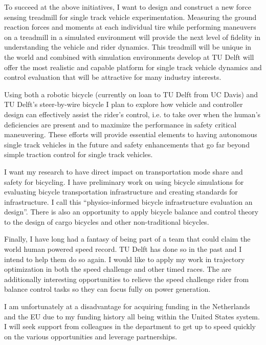 \documentclass{article}
\begin{document}
To succeed at the above initiatives, I want to design and construct a new force
sensing treadmill for single track vehicle experimentation. Measuring the
ground reaction forces and moments at each individual tire while performing
maneuvers on a treadmill in a simulated environment will provide the next level
of fidelity in understanding the vehicle and rider dynamics. This treadmill
will be unique in the world and combined with simulation environments develop
at TU Delft will offer the most realistic and capable platform for single track
vehicle dynamics and control evaluation that will be attractive for many
industry interests.

Using both a robotic bicycle (currently on loan to TU Delft from UC Davis) and
TU Delft's steer-by-wire bicycle I plan to explore how vehicle and controller
design can effectively assist the rider's control, i.e. to take over when the
human's deficiencies are present and to maximize the performance in safety
critical maneuvering. These efforts will provide essential elements to having
autonomous single track vehicles in the future and safety enhancements that go
far beyond simple traction control for single track vehicles.

I want my research to have direct impact on transportation mode share and
safety for bicycling. I have preliminary work on using bicycle simulations for
evaluating bicycle transportation infrastructure and creating standards for
infrastructure. I call this ``physics-informed bicycle infrastructure
evaluation an design''. There is also an opportunity to apply bicycle balance
and control theory to the design of cargo bicycles and other non-traditional
bicycles.

Finally, I have long had a fantasy of being part of a team that could claim the
world human powered speed record. TU Delft has done so in the past and I intend
to help them do so again. I would like to apply my work in trajectory
optimization in both the speed challenge and other timed races. The are
additionally interesting opportunities to relieve the speed challenge rider
from balance control tasks so they can focus fully on power generation.

I am unfortunately at a disadvantage for acquiring funding in the Netherlands
and the EU due to my funding history all being within the United States system.
I will seek support from colleagues in the department to get up to speed
quickly on the various opportunities and leverage partnerships.




\end{document}
